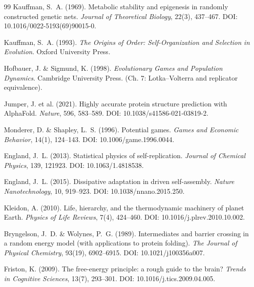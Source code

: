 \documentclass[12pt,a4paper]{article}
\theoremstyle{remark}
\begin{document}
\begin{thebibliography}{99}
Kauffman, S.~A. (1969).
\newblock Metabolic stability and epigenesis in randomly constructed genetic nets.
\newblock \textit{Journal of Theoretical Biology}, 22(3), 437--467.
\newblock DOI: 10.1016/0022-5193(69)90015-0.

Kauffman, S.~A. (1993).
\newblock \textit{The Origins of Order: Self-Organization and Selection in Evolution}.
\newblock Oxford University Press.

Hofbauer, J. \& Sigmund, K. (1998).
\newblock \textit{Evolutionary Games and Population Dynamics}.
\newblock Cambridge University Press. (Ch. 7: Lotka--Volterra and replicator equivalence).

Jumper, J. et al. (2021).
\newblock Highly accurate protein structure prediction with AlphaFold.
\newblock \textit{Nature}, 596, 583--589.
\newblock DOI: 10.1038/s41586-021-03819-2.

Monderer, D. \& Shapley, L.~S. (1996).
\newblock Potential games.
\newblock \textit{Games and Economic Behavior}, 14(1), 124--143.
\newblock DOI: 10.1006/game.1996.0044.

England, J.~L. (2013).
\newblock Statistical physics of self-replication.
\newblock \textit{Journal of Chemical Physics}, 139, 121923.
\newblock DOI: 10.1063/1.4818538.

England, J.~L. (2015).
\newblock Dissipative adaptation in driven self-assembly.
\newblock \textit{Nature Nanotechnology}, 10, 919--923.
\newblock DOI: 10.1038/nnano.2015.250.

Kleidon, A. (2010).
\newblock Life, hierarchy, and the thermodynamic machinery of planet Earth.
\newblock \textit{Physics of Life Reviews}, 7(4), 424--460.
\newblock DOI: 10.1016/j.plrev.2010.10.002.

Bryngelson, J.~D. \& Wolynes, P.~G. (1989).
\newblock Intermediates and barrier crossing in a random energy model (with applications to protein folding).
\newblock \textit{The Journal of Physical Chemistry}, 93(19), 6902--6915.
\newblock DOI: 10.1021/j100356a007.

Friston, K. (2009).
\newblock The free-energy principle: a rough guide to the brain?
\newblock \textit{Trends in Cognitive Sciences}, 13(7), 293--301.
\newblock DOI: 10.1016/j.tics.2009.04.005.


\end{thebibliography}
\end{document}
